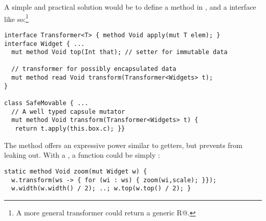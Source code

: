 A simple and practical solution would be to define a \Q@transform@ method in \Q@Widget@, and a \Q@Transformer@ interface 
like so:\footnote{A more general transformer could return a generic \Q@read R@.}
\begin{lstlisting}
interface Transformer<T> { method Void apply(mut T elem); }
interface Widget { ...
  mut method Void top(Int that); // setter for immutable data
  
  // transformer for possibly encapsulated data
  mut method read Void transform(Transformer<Widgets> t);
}

class SafeMovable { ...
  // A well typed capsule mutator
  mut method Void transform(Transformer<Widgets> t) {
   return t.apply(this.box.c); }}
\end{lstlisting}\saveSpace
The \Q@transform@ method offers an expressive power similar to \Q@mut@ getters, but prevents \Q@Widgets@ from leaking out.  With a \Q@Transformer@, a \Q@zoom@ function could be simply :
\begin{lstlisting}
static method Void zoom(mut Widget w) {
  w.transform(ws -> { for (wi : ws) { zoom(wi,scale); }});
  w.width(w.width() / 2); ..; w.top(w.top() / 2); }
\end{lstlisting}




